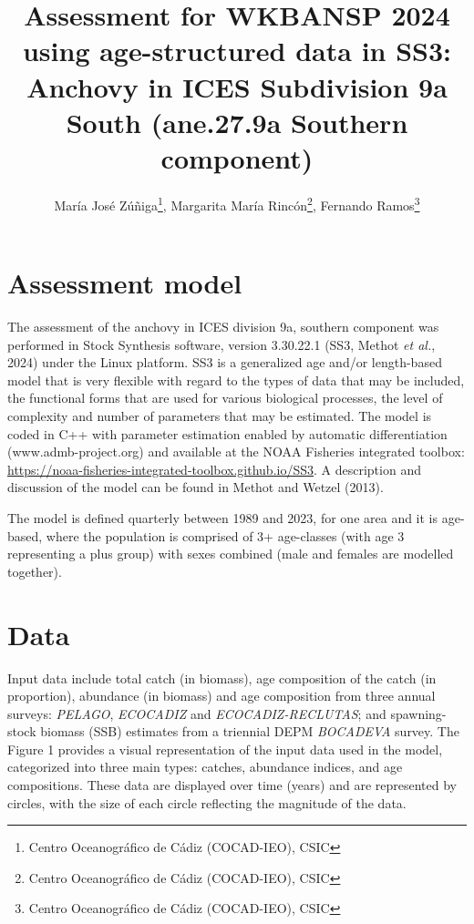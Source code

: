 \documentclass[
]{article}
\title{Assessment for WKBANSP 2024 using age-structured data in SS3:
Anchovy in ICES Subdivision 9a South (ane.27.9a Southern component)}
\author{María José
Zúñiga\thanks{Centro Oceanográfico de Cádiz (COCAD-IEO), CSIC},
Margarita María
Rincón\thanks{Centro Oceanográfico de Cádiz (COCAD-IEO), CSIC}, Fernando
Ramos\thanks{Centro Oceanográfico de Cádiz (COCAD-IEO), CSIC}}
\date{}
\begin{document}
\maketitle

\hypertarget{assessment-model}{%
\section{Assessment model}\label{assessment-model}}

The assessment of the anchovy in ICES division 9a, southern component
was performed in Stock Synthesis software, version 3.30.22.1 (SS3,
Methot \emph{et al.}, 2024) under the Linux platform. SS3 is a
generalized age and/or length-based model that is very flexible with
regard to the types of data that may be included, the functional forms
that are used for various biological processes, the level of complexity
and number of parameters that may be estimated. The model is coded in
C++ with parameter estimation enabled by automatic differentiation
(www.admb-project.org) and available at the NOAA Fisheries integrated
toolbox: \url{https://noaa-fisheries-integrated-toolbox.github.io/SS3}.
A description and discussion of the model can be found in Methot and
Wetzel (2013).

The model is defined quarterly between 1989 and 2023, for one area and
it is age-based, where the population is comprised of 3+ age-classes
(with age 3 representing a plus group) with sexes combined (male and
females are modelled together).

\hypertarget{data}{%
\section{Data}\label{data}}

Input data include total catch (in biomass), age composition of the
catch (in proportion), abundance (in biomass) and age composition from
three annual surveys: \emph{PELAGO}, \emph{ECOCADIZ} and
\emph{ECOCADIZ-RECLUTAS}; and spawning-stock biomass (SSB) estimates
from a triennial DEPM \emph{BOCADEVA} survey. The Figure 1 provides a
visual representation of the input data used in the model, categorized
into three main types: catches, abundance indices, and age compositions.
These data are displayed over time (years) and are represented by
circles, with the size of each circle reflecting the magnitude of the
data.
\end{document}
